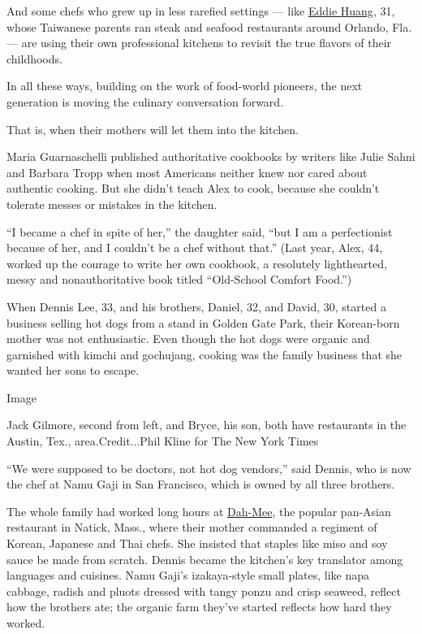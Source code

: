 And some chefs who grew up in less rarefied settings --- like
\href{http://www.nytimes3xbfgragh.onion/2013/01/24/fashion/eddie-huang-defies-description.html?pagewanted=all}{Eddie
Huang}, 31, whose Taiwanese parents ran steak and seafood restaurants
around Orlando, Fla. --- are using their own professional kitchens to
revisit the true flavors of their childhoods.

In all these ways, building on the work of food-world pioneers, the next
generation is moving the culinary conversation forward.

That is, when their mothers will let them into the kitchen.

Maria Guarnaschelli published authoritative cookbooks by writers like
Julie Sahni and Barbara Tropp when most Americans neither knew nor cared
about authentic cooking. But she didn't teach Alex to cook, because she
couldn't tolerate messes or mistakes in the kitchen.

``I became a chef in spite of her,'' the daughter said, ``but I am a
perfectionist because of her, and I couldn't be a chef without that.''
(Last year, Alex, 44, worked up the courage to write her own cookbook, a
resolutely lighthearted, messy and nonauthoritative book titled
``Old-School Comfort Food.'')

When Dennis Lee, 33, and his brothers, Daniel, 32, and David, 30,
started a business selling hot dogs from a stand in Golden Gate Park,
their Korean-born mother was not enthusiastic. Even though the hot dogs
were organic and garnished with kimchi and gochujang, cooking was the
family business that she wanted her sons to escape.

Image

Jack Gilmore, second from left, and Bryce, his son, both have
restaurants in the Austin, Tex., area.Credit...Phil Kline for The New
York Times

``We were supposed to be doctors, not hot dog vendors,'' said Dennis,
who is now the chef at Namu Gaji in San Francisco, which is owned by all
three brothers.

The whole family had worked long hours at
\href{http://www.dahmee.com/}{Dah-Mee}, the popular pan-Asian restaurant
in Natick, Mass., where their mother commanded a regiment of Korean,
Japanese and Thai chefs. She insisted that staples like miso and soy
sauce be made from scratch. Dennis became the kitchen's key translator
among languages and cuisines. Namu Gaji's izakaya-style small plates,
like napa cabbage, radish and pluots dressed with tangy ponzu and crisp
seaweed, reflect how the brothers ate; the organic farm they've started
reflects how hard they worked.

